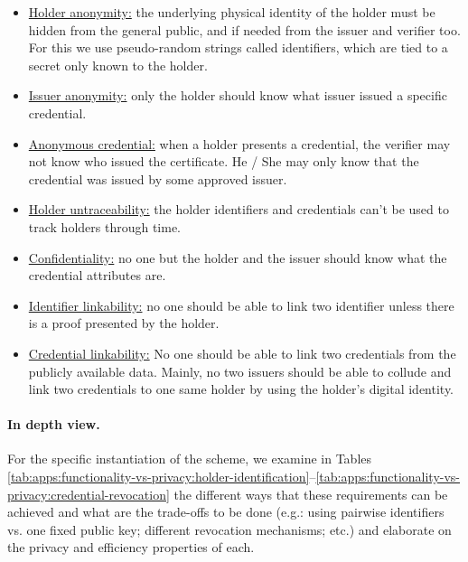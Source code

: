 \begin{itemize}
		\item \underline{Holder anonymity:} the underlying physical identity of the holder must be hidden from the general public, and if needed from the issuer and verifier too. For this we use pseudo-random strings called identifiers, which are tied to a secret only known to the holder. 
		\item \underline{Issuer anonymity:} only the holder should know what issuer issued a specific credential.
		\item \underline{Anonymous credential:} when a holder presents a credential, the verifier may not know who issued the certificate. He / She may only know that the credential was issued by some approved issuer.
		\item \underline{Holder untraceability:} the holder identifiers and credentials can’t be used to track holders through time.
		\item \underline{Confidentiality:} no one but the holder and the issuer should know what the credential attributes are.
		\item \underline{Identifier linkability:} no one should be able to link two identifier unless there is a proof presented by the holder.
		\item \underline{Credential linkability:} No one should be able to link two credentials from the publicly available data. Mainly, no two issuers should be able to collude and link two credentials to one same holder by using the holder’s digital identity.
\end{itemize}



\paragraph{In depth view.} 
For the specific instantiation of the scheme, we examine in 
Tables \ref{tab:apps:functionality-vs-privacy:holder-identification}--\ref{tab:apps:functionality-vs-privacy:credential-revocation}
the different ways that these requirements can be achieved and what are the trade-offs to be done 
(e.g.: using pairwise identifiers vs. one fixed public key; different revocation mechanisms; etc.) and elaborate on the privacy and efficiency properties of each. 



